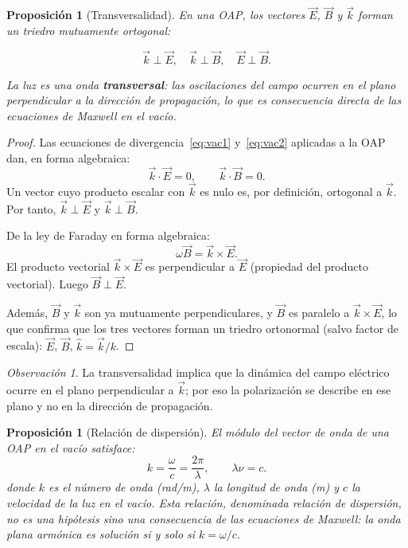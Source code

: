 \documentclass[12pt, a4paper]{article}
\theoremstyle{plain}
\newtheorem{proposicion}[teorema]{Proposición}
\theoremstyle{definition}
\theoremstyle{remark}
\newtheorem*{observacion}{Observación}
\newcommand{\ve}[1]{\vec{#1}}
\newcommand{\uvec}[1]{\hat{#1}}
\begin{document}
\begin{proposicion}[Transversalidad]
En una OAP, los vectores $\ve{E}$, $\ve{B}$ y $\ve{k}$ forman un triedro
mutuamente ortogonal:
\begin{mdframed}[style=resultado]
\begin{equation}
  \ve{k}\perp\ve{E}, \quad \ve{k}\perp\ve{B}, \quad \ve{E}\perp\ve{B}.
  \label{eq:transversal}
\end{equation}
\end{mdframed}
La luz es una onda \textbf{transversal}: las oscilaciones del campo ocurren
en el plano perpendicular a la dirección de propagación, lo que es consecuencia
directa de las ecuaciones de Maxwell en el vacío.
\end{proposicion}

\begin{proof}
Las ecuaciones de divergencia~\eqref{eq:vac1} y~\eqref{eq:vac2} aplicadas
a la OAP dan, en forma algebraica:
\[
  \ve{k}\cdot\ve{E}=0,
  \qquad
  \ve{k}\cdot\ve{B}=0.
\]
Un vector cuyo producto escalar con $\ve{k}$ es nulo es, por definición,
ortogonal a $\ve{k}$. Por tanto, $\ve{k}\perp\ve{E}$ y $\ve{k}\perp\ve{B}$.

De la ley de Faraday en forma algebraica:
\[
  \omega\ve{B}=\ve{k}\times\ve{E}.
\]
El producto vectorial $\ve{k}\times\ve{E}$ es perpendicular a $\ve{E}$ (propiedad
del producto vectorial). Luego $\ve{B}\perp\ve{E}$.

Además, $\ve{B}$ y $\ve{k}$ son ya mutuamente perpendiculares, y $\ve{B}$ es
paralelo a $\ve{k}\times\ve{E}$, lo que confirma que los tres vectores forman
un triedro ortonormal (salvo factor de escala): $\ve{E}$, $\ve{B}$,
$\uvec{k} = \ve{k}/k$.
\end{proof}

\begin{observacion}
La transversalidad implica que la dinámica del campo eléctrico ocurre en el
plano perpendicular a $\ve{k}$; por eso la polarización se describe en ese
plano y no en la dirección de propagación.
\end{observacion}

\begin{proposicion}[Relación de dispersión]
El módulo del vector de onda de una OAP en el vacío satisface:
\begin{equation}
  k = \frac{\omega}{c} = \frac{2\pi}{\lambda}, \qquad \lambda\nu = c.
  \label{eq:dispersion}
\end{equation}
donde $k$ es el número de onda (rad/m), $\lambda$ la longitud de onda (m) y $c$
la velocidad de la luz en el vacío. Esta relación, denominada \emph{relación de
dispersión}, no es una hipótesis sino una consecuencia de las ecuaciones de
Maxwell: la onda plana armónica es solución si y solo si $k = \omega/c$.
\end{proposicion}
\end{document}
